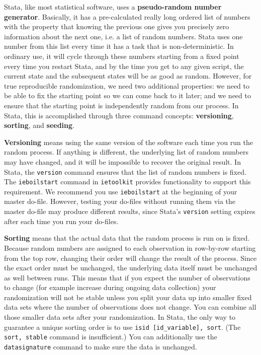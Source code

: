 Stata, like most statistical software, uses a \textbf{pseudo-random number generator}.
Basically, it has a pre-calculated really long ordered list of numbers with the property that
knowing the previous one gives you precisely zero information about the next one, i.e. a list of random numbers.
Stata uses one number from this list every time it has a task that is non-deterministic.
In ordinary use, it will cycle through these numbers starting from a fixed point
every time you restart Stata, and by the time you get to any given script,
the current state and the subsequent states will be as good as random.
However, for true reproducible randomization, we need two additional properties:
we need to be able to fix the starting point so we can come back to it later;
and we need to ensure that the starting point is independently random from our process.
In Stata, this is accomplished through three command concepts:
\textbf{versioning}, \textbf{sorting}, and \textbf{seeding}.

\textbf{Versioning} means using the same version of the software each time you run the random process.
If anything is different, the underlying list of random numbers may have changed,
and it will be impossible to recover the original result.
In Stata, the \texttt{version} command ensures that the list of random numbers is fixed.
The \texttt{ieboilstart} command in \texttt{ietoolkit} provides functionality to support this requirement.
We recommend you use \texttt{ieboilstart} at the beginning of your master do-file.
However, testing your do-files without running them
via the master do-file may produce different results,
since Stata's \texttt{version} setting expires after each time you run your do-files.

\textbf{Sorting} means that the actual data that the random process is run on is fixed.
Because random numbers are assigned to each observation in row-by-row starting from
the top row,
changing their order will change the result of the process.
Since the exact order must be unchanged, the underlying data itself must be unchanged as well between runs.
This means that if you expect the number of observations to change (for example increase during
ongoing data collection) your randomization will not be stable unless you split your data up into
smaller fixed data sets where the number of observations does not change. You can combine all
those smaller data sets after your randomization.
In Stata, the only way to guarantee a unique sorting order is to use
\texttt{isid [id\_variable], sort}. (The \texttt{sort, stable} command is insufficient.)
You can additionally use the \texttt{datasignature} command to make sure the
data is unchanged.


